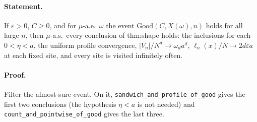 \paragraph{Statement.} If $\varepsilon>0$, $C\geq0$, and for $\mu$-a.e.\ $\omega$ the event $\mathrm{Good}(C,X(\omega),n)$ holds for all large $n$, then
$\mu$-a.s.\ every conclusion of thm:shape holds: the inclusions for each $0<\eta<a$, the uniform profile convergence, $|V_n|/N^d\to\omega_da^d$,
$\ell_n(x)/N\to2d\varepsilon a$ at each fixed site, and every site is visited infinitely often.
\paragraph{Proof.} Filter the almost-sure event. On it, \texttt{sandwich\_and\_profile\_of\_good} gives the first two conclusions (the hypothesis $\eta<a$
is not needed) and \texttt{count\_and\_pointwise\_of\_good} gives the last three.
